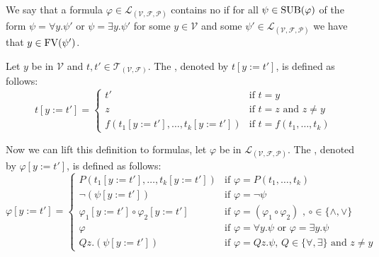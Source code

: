 \begin{definition}\label{def.2.19}
We say that a formula $\varphi\in\mathcal{L}_{(\mathcal{V},\mathcal{F},\mathcal{P})}$ contains no  if for all $\psi\in\text{SUB}(\varphi)$ of the form $\psi=\forall y.\psi'$ or $\psi=\exists y.\psi'$ for some $y\in\mathcal{V}$ and some $\psi'\in\mathcal{L}_{(\mathcal{V},\mathcal{F},\mathcal{P})}$ we have that $y\in\text{FV}(\psi')$.
\end{definition}

\begin{definition}\label{def.2.20}
	Let $y$ be in $\mathcal{V}$ and $t,t'\in\mathcal{T}_{(\mathcal{V},\mathcal{F})}$. The , denoted by $t\left[y:=t'\right]$, is defined as follows:
	\[t\left[y:=t'\right]=
		\begin{cases}
			t'                                                   & \text{if $t=y$}                \\ 
			z                                                    & \text{if $t=z$ and $z\neq y$}  \\%
			f(t_1\left[y:=t'\right],\dots,t_k\left[y:=t'\right]) & \text{if $t=f(t_1,\dots,t_k)$} 
		\end{cases}\]
	
	Now we can lift this definition to formulas, let $\varphi$ be in $\mathcal{L}_{(\mathcal{V},\mathcal{F},\mathcal{P})}$. The , denoted by $\varphi\left[y:=t'\right]$, is defined as follows:
	\[\varphi\left[y:=t'\right]=
		\begin{cases}
			P(t_1\left[y:=t'\right],\dots,t_k\left[y:=t'\right])        & \text{if $\varphi=P(t_1,\dots,t_k)$}                                     \\
			\neg(\psi\left[y:=t'\right])                                      & \text{if $\varphi=\neg\psi$}                                             \\ %
			\varphi_1\left[y:=t'\right]\circ\varphi_2\left[y:=t'\right] & \text{if $\varphi=(\varphi_1\circ\varphi_2)$ , $\circ\in\{\wedge,\vee\}$} \\
			\varphi                                                     & \text{if $\varphi=\forall y.\psi$ or $\varphi=\exists y.\psi$}                   \\
			Q z.(\psi\left[y:=t'\right])                                 & \text{if $\varphi=Q z.\psi$, $Q\in\{\forall,\exists\}$ and $z\neq y$}     
		\end{cases}\]

\end{definition}
